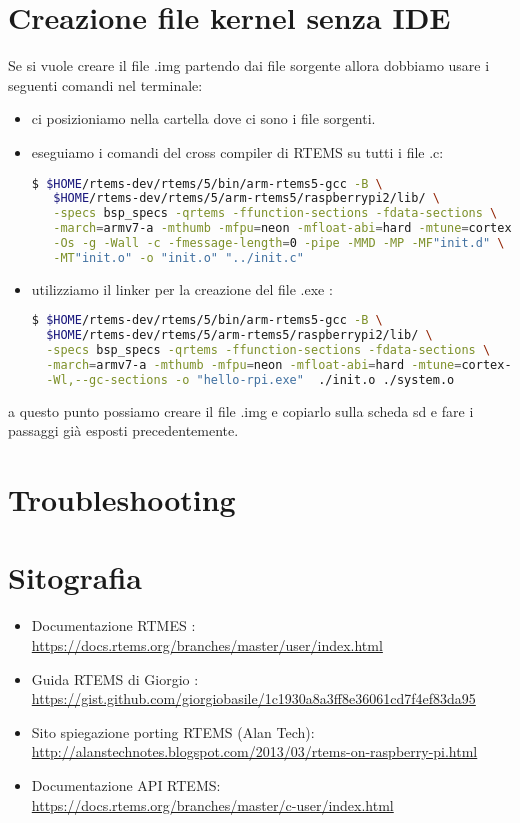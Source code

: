 \documentclass[10pt, a4paper]{article}
\begin{document}
\begin{flushleft}
\section{Creazione file kernel senza IDE}
Se si vuole creare il file .img partendo dai file sorgente allora dobbiamo usare i seguenti comandi nel terminale:
\begin{itemize}
\item ci posizioniamo nella cartella dove ci sono i file sorgenti.
\item eseguiamo i comandi del cross compiler di RTEMS su tutti i file .c: 
\begin{lstlisting}[language= bash] 
 $ $HOME/rtems-dev/rtems/5/bin/arm-rtems5-gcc -B \
   $HOME/rtems-dev/rtems/5/arm-rtems5/raspberrypi2/lib/ \
   -specs bsp_specs -qrtems -ffunction-sections -fdata-sections \
   -march=armv7-a -mthumb -mfpu=neon -mfloat-abi=hard -mtune=cortex-a7 \
   -Os -g -Wall -c -fmessage-length=0 -pipe -MMD -MP -MF"init.d" \
   -MT"init.o" -o "init.o" "../init.c"
\end{lstlisting}
\item utilizziamo il linker per la creazione del file .exe :
\begin{lstlisting}[language= bash] 
$ $HOME/rtems-dev/rtems/5/bin/arm-rtems5-gcc -B \
  $HOME/rtems-dev/rtems/5/arm-rtems5/raspberrypi2/lib/ \
  -specs bsp_specs -qrtems -ffunction-sections -fdata-sections \
  -march=armv7-a -mthumb -mfpu=neon -mfloat-abi=hard -mtune=cortex-a7 \
  -Wl,--gc-sections -o "hello-rpi.exe"  ./init.o ./system.o    
\end{lstlisting}

\end{itemize}
\item a questo punto possiamo creare il file .img e copiarlo sulla scheda sd e fare i passaggi già esposti precedentemente.

\newpage
\section{Troubleshooting}

\newpage
\section{Sitografia}
\begin{itemize}
\item Documentazione RTMES :\\ \url{https://docs.rtems.org/branches/master/user/index.html}
\item Guida RTEMS di Giorgio :\\ \url{https://gist.github.com/giorgiobasile/1c1930a8a3ff8e36061cd7f4ef83da95}
\item Sito spiegazione porting RTEMS (Alan Tech):\\ \url{http://alanstechnotes.blogspot.com/2013/03/rtems-on-raspberry-pi.html} 
\item Documentazione API RTEMS:\\ \url{https://docs.rtems.org/branches/master/c-user/index.html}
\end{itemize}

\end{flushleft}
\end{document}
